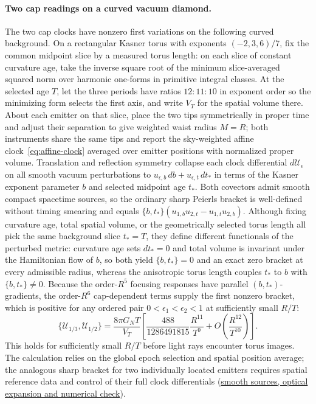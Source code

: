 \documentclass[10pt,a4paper]{article}
\numberwithin{equation}{section}
\newcommand{\repo}[2]{\href{https://github.com/sprajs/quantum-gravity/blob/main/#1}{#2}}
\begin{document}
\paragraph{Two cap readings on a curved vacuum diamond.}
The two cap clocks have nonzero first variations on the following curved background. On a rectangular Kasner torus with exponents $(-2,3,6)/7$, fix the common midpoint slice by a measured torus length: on each slice of constant curvature age, take the inverse square root of the minimum slice-averaged squared norm over harmonic one-forms in primitive integral classes. At the selected age $T$, let the three periods have ratios $12:11:10$ in exponent order so the minimizing form selects the first axis, and write $V_T$ for the spatial volume there. About each emitter on that slice, place the two tips symmetrically in proper time and adjust their separation to give weighted waist radius $M=R$; both instruments share the same tips and report the sky-weighted affine clock~\eqref{eq:affine-clock} averaged over emitter positions with normalized proper volume. Translation and reflection symmetry collapse each clock differential $d\mathcal U_\epsilon$ on all smooth vacuum perturbations to $u_{\epsilon,b}\,db+u_{\epsilon,t}\,dt_*$ in terms of the Kasner exponent parameter $b$ and selected midpoint age $t_*$. Both covectors admit smooth compact spacetime sources, so the ordinary sharp Peierls bracket is well-defined without timing smearing and equals $\{b,t_*\}(u_{1,b}u_{2,t}-u_{1,t}u_{2,b})$. Although fixing curvature age, total spatial volume, or the geometrically selected torus length all pick the same background slice $t_*=T$, they define different functionals of the perturbed metric: curvature age sets $dt_*=0$ and total volume is invariant under the Hamiltonian flow of $b$, so both yield $\{b,t_*\}=0$ and an exact zero bracket at every admissible radius, whereas the anisotropic torus length couples $t_*$ to $b$ with $\{b,t_*\}\neq0$. Because the order-$R^5$ focusing responses have parallel $(b,t_*)$-gradients, the order-$R^6$ cap-dependent terms supply the first nonzero bracket, which is positive for any ordered pair $0<\epsilon_1<\epsilon_2<1$ at sufficiently small $R/T$:
\begin{equation}
 \{\mathcal U_{1/3},\mathcal U_{1/2}\}
 =\frac{8\pi G_N T}{V_T}
 \left[\frac{488}{1286491815}\frac{R^{11}}{T^9}
       +O\!\left(\frac{R^{12}}{T^{10}}\right)\right].
 \label{eq:timing-kasner}
\end{equation}
This holds for sufficiently small $R/T$ before light rays encounter torus images. The calculation relies on the global epoch selection and spatial position average; the analogous sharp bracket for two individually located emitters requires spatial reference data and control of their full clock differentials (\repo{audit/timing-kasner.md}{smooth sources, optical expansion and numerical check}).
\end{document}
